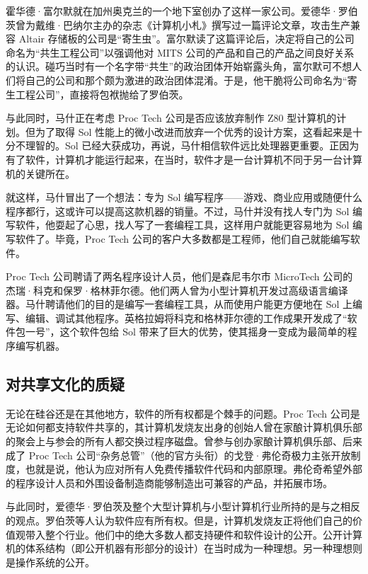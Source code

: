 \documentclass[12pt,UTF8]{ctexbook}
\begin{document}
霍华德·富尔默就在加州奥克兰的一个地下室创办了这样一家公司。爱德华·罗伯茨曾为戴维·巴纳尔主办的杂志《计算机小札》撰写过一篇评论文章，攻击生产兼容 Altair 存储板的公司是“寄生虫”。富尔默读了这篇评论后，决定将自己的公司命名为“共生工程公司”以强调他对 MITS 公司的产品和自己的产品之间良好关系的认识。碰巧当时有一个名字带“共生”的政治团体开始崭露头角，富尔默可不想人们将自己的公司和那个颇为激进的政治团体混淆。于是，他干脆将公司命名为“寄生工程公司”，直接将包袱抛给了罗伯茨。

与此同时，马什正在考虑 Proc Tech 公司是否应该放弃制作 Z80 型计算机的计划。但为了取得 Sol 性能上的微小改进而放弃一个优秀的设计方案，这看起来是十分不理智的。Sol 已经大获成功，再说，马什相信软件远比处理器更重要。正因为有了软件，计算机才能运行起来，在当时，软件才是一台计算机不同于另一台计算机的关键所在。

就这样，马什冒出了一个想法：专为 Sol 编写程序——游戏、商业应用或随便什么程序都行，这或许可以提高这款机器的销量。不过，马什并没有找人专门为 Sol 编写软件，他耍起了心思，找人写了一套编程工具，这样用户就能更容易地为 Sol 编写软件了。毕竟，Proc Tech 公司的客户大多数都是工程师，他们自己就能编写软件。

Proc Tech 公司聘请了两名程序设计人员，他们是森尼韦尔市 MicroTech 公司的杰瑞·科克和保罗·格林菲尔德。他们两人曾为小型计算机开发过高级语言编译器。马什聘请他们的目的是编写一套编程工具，从而使用户能更方便地在 Sol 上编写、编辑、调试其他程序。英格拉姆将科克和格林菲尔德的工作成果开发成了“软件包一号”，这个软件包给 Sol 带来了巨大的优势，使其摇身一变成为最简单的程序编写机器。





\subsection{对共享文化的质疑}


无论在硅谷还是在其他地方，软件的所有权都是个棘手的问题。Proc Tech 公司是无论如何都支持软件共享的，其计算机发烧友出身的创始人曾在家酿计算机俱乐部的聚会上与参会的所有人都交换过程序磁盘。曾参与创办家酿计算机俱乐部、后来成了 Proc Tech 公司“杂务总管”（他的官方头衔）的戈登·弗伦奇极力主张开放制度，也就是说，他认为应对所有人免费传播软件代码和内部原理。弗伦奇希望外部的程序设计人员和外围设备制造商能够制造出可兼容的产品，并拓展市场。

与此同时，爱德华·罗伯茨及整个大型计算机与小型计算机行业所持的是与之相反的观点。罗伯茨等人认为软件应有所有权。但是，计算机发烧友正将他们自己的价值观带入整个行业。他们中的绝大多数人都支持硬件和软件设计的公开。公开计算机的体系结构（即公开机器有形部分的设计）在当时成为一种理想。另一种理想则是操作系统的公开。
\end{document}
